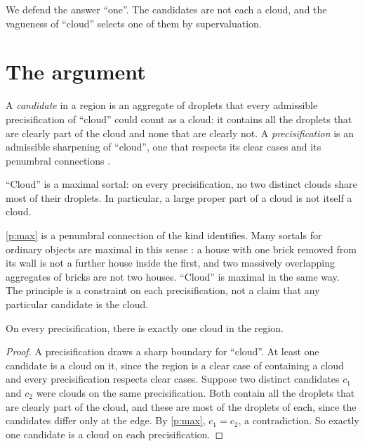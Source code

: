 \documentclass{situationist-preprint}
\begin{document}
We defend the answer \enquote{one}. The candidates are not each a cloud, and the vagueness of \enquote{cloud} selects one of them by supervaluation.

\section{The argument}

\begin{definition}\label{d:cand}
A \emph{candidate} in a region is an aggregate of droplets that every admissible precisification of \enquote{cloud} could count as a cloud: it contains all the droplets that are clearly part of the cloud and none that are clearly not. A \emph{precisification} is an admissible sharpening of \enquote{cloud}, one that respects its clear cases and its penumbral connections \citep{Fine1975}.
\end{definition}

\begin{principle}[Maximality]\label{p:max}
\enquote{Cloud} is a maximal sortal: on every precisification, no two distinct clouds share most of their droplets. In particular, a large proper part of a cloud is not itself a cloud.
\end{principle}

\ref{p:max} is a penumbral connection of the kind \citet{Fine1975} identifies. Many sortals for ordinary objects are maximal in this sense \citep{Sider2003}: a house with one brick removed from its wall is not a further house inside the first, and two massively overlapping aggregates of bricks are not two houses. \enquote{Cloud} is maximal in the same way. The principle is a constraint on each precisification, not a claim that any particular candidate is the cloud.

\begin{proposition}\label{p:one}
On every precisification, there is exactly one cloud in the region.
\end{proposition}

\begin{proof}
A precisification draws a sharp boundary for \enquote{cloud}. At least one candidate is a cloud on it, since the region is a clear case of containing a cloud and every precisification respects clear cases. Suppose two distinct candidates $c_1$ and $c_2$ were clouds on the same precisification. Both contain all the droplets that are clearly part of the cloud, and these are most of the droplets of each, since the candidates differ only at the edge. By \ref{p:max}, $c_1 = c_2$, a contradiction. So exactly one candidate is a cloud on each precisification.
\end{proof}
\end{document}
